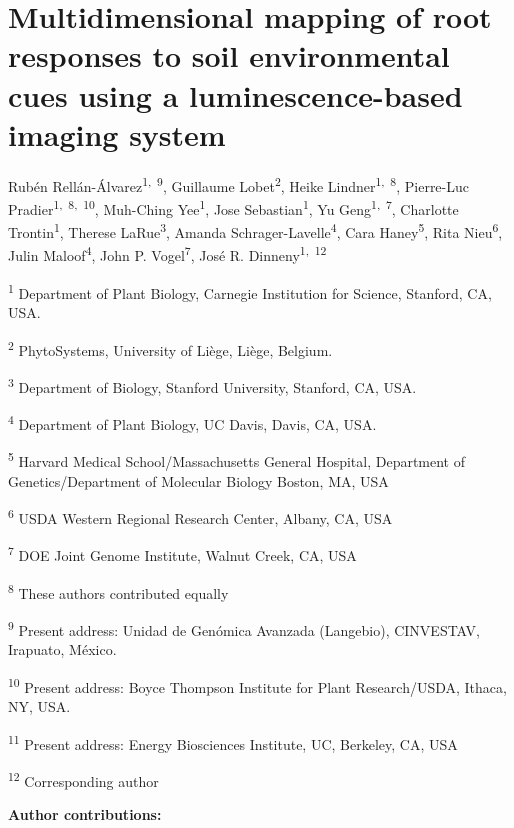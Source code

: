 \documentclass[]{article}
\date{}
\begin{document}
\section{Multidimensional mapping of root responses to soil
environmental cues using a luminescence-based imaging
system}\label{multidimensional-mapping-of-root-responses-to-soil-environmental-cues-using-a-luminescence-based-imaging-system}

Rubén Rellán-Álvarez\textsuperscript{1,~9}, Guillaume
Lobet\textsuperscript{2}, Heike Lindner\textsuperscript{1,~8},
Pierre-Luc Pradier\textsuperscript{1,~8,~10}, Muh-Ching
Yee\textsuperscript{1}, Jose Sebastian\textsuperscript{1}, Yu
Geng\textsuperscript{1,~7}, Charlotte Trontin\textsuperscript{1},
Therese LaRue\textsuperscript{3}, Amanda
Schrager-Lavelle\textsuperscript{4}, Cara Haney\textsuperscript{5}, Rita
Nieu\textsuperscript{6}, Julin Maloof\textsuperscript{4}, John P.
Vogel\textsuperscript{7}, José R. Dinneny\textsuperscript{1,~12}

\textsuperscript{1} Department of Plant Biology, Carnegie Institution
for Science, Stanford, CA, USA.

\textsuperscript{2} PhytoSystems, University of Liège, Liège, Belgium.

\textsuperscript{3} Department of Biology, Stanford University,
Stanford, CA, USA.

\textsuperscript{4} Department of Plant Biology, UC Davis, Davis, CA,
USA.

\textsuperscript{5} Harvard Medical School/Massachusetts General
Hospital, Department of Genetics/Department of Molecular Biology Boston,
MA, USA

\textsuperscript{6} USDA Western Regional Research Center, Albany, CA,
USA

\textsuperscript{7} DOE Joint Genome Institute, Walnut Creek, CA, USA

\textsuperscript{8} These authors contributed equally

\textsuperscript{9} Present address: Unidad de Genómica Avanzada
(Langebio), CINVESTAV, Irapuato, México.

\textsuperscript{10} Present address: Boyce Thompson Institute for Plant
Research/USDA, Ithaca, NY, USA.

\textsuperscript{11} Present address: Energy Biosciences Institute, UC,
Berkeley, CA, USA

\textsuperscript{12} Corresponding author

\textbf{Author contributions:}
\end{document}
